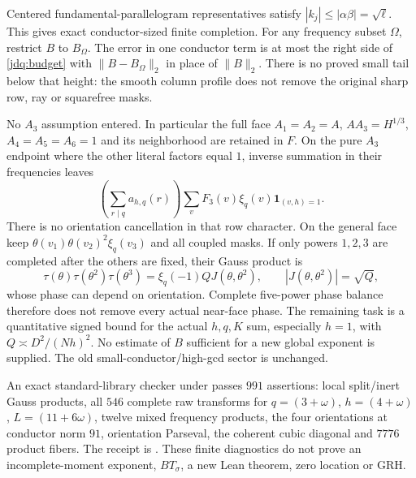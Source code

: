 Centered fundamental-parallelogram representatives satisfy
$|k_j|\le|\alpha\beta|=\sqrt\ell$. This gives exact conductor-sized
finite completion. For any frequency subset $\Omega$, restrict $B$ to
$B_\Omega$. The error in one conductor term is at most the right side
of \eqref{jdq:budget} with $\|B-B_\Omega\|_2$ in place of $\|B\|_2$.
There is no proved small tail below that height: the smooth column
profile does not remove the original sharp row, ray or squarefree masks.

No $A_3$ assumption entered. In particular the full face
$A_1=A_2=A$, $AA_3=H^{1/3}$, $A_4=A_5=A_6=1$ and its neighborhood
are retained in $F$. On the pure $A_3$ endpoint where the other literal
factors equal $1$, inverse summation in their frequencies leaves
\[
 \left(\sum_{r\mid q}a_{h,q}(r)\right)
 \sum_vF_3(v)\xi_q(v)\mathbf1_{(v,h)=1}.
\]
There is no orientation cancellation in that row character.
On the general face keep $\theta(v_1)\theta(v_2)^2\xi_q(v_3)$
and all coupled masks. If only powers $1,2,3$ are completed after the
others are fixed, their Gauss product is
\[
 \tau(\theta)\tau(\theta^2)\tau(\theta^3)
 =\xi_q(-1)QJ(\theta,\theta^2),\qquad |J(\theta,\theta^2)|=\sqrt Q,
\]
whose phase can depend on orientation. Complete five-power phase
balance therefore does not remove every actual near-face phase.
The remaining task is a quantitative signed bound for the actual
$h,q,K$ sum, especially $h=1$, with $Q\asymp D^2/(Nh)^2$.
No estimate of $B$ sufficient for a new global exponent is supplied.
The old small-conductor/high-gcd sector is unchanged.

An exact standard-library checker under
 passes $991$ assertions:
local split/inert Gauss products, all $546$ complete raw transforms for
$q=(3+\omega)$, $h=(4+\omega)$, $L=(11+6\omega)$, twelve mixed
frequency products, the four orientations at conductor norm $91$,
orientation Parseval, the coherent cubic diagonal and $7776$ product
fibers. The receipt is
.
These finite diagnostics do not prove an incomplete-moment exponent,
$BT_\sigma$, a new Lean theorem, zero location or GRH.
